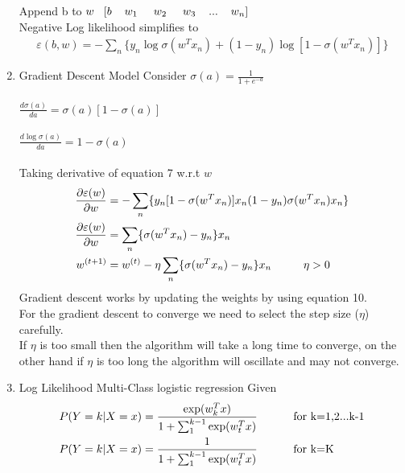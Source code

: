 \documentclass[12pt]{article}
\begin{document}
\begin{enumerate}[label=\alph*.]
    Append b to $w \hspace{3mm} [b \hspace{4mm} w_1 \hspace{5mm} w_2 \hspace{5mm} w_3 \hspace{4mm} ... \hspace{4mm} w_n]$\\
Negative Log likelihood simplifies to\\
\begin{align}
\varepsilon(b,w) = - \sum_n \{ y_n\log \sigma(w^T x_n) + (1-y_n) \log[1 - \sigma(w^T x_n)] \}
\end{align}
\newpage
\item Gradient Descent Model
Consider $\sigma(a) = \frac{1}{1+e^{-a}}$\\ \\
$\frac{d\sigma(a)}{da} = \sigma(a)[1 - \sigma(a)]$\\\\
$\frac{d\log \sigma(a)}{da} = 1 - \sigma(a)$\\\\
Taking derivative of equation 7 w.r.t $w$\\
\begin{align}
\frac{\partial \varepsilon(w) }{\partial w} &= - \sum_n \{ y_n[1-\sigma(w^T x_n)]x_n (1-y_n) \sigma (w^T x_n)x_n\}\\
\frac{\partial \varepsilon(w) }{\partial w} &= \sum_n \{ \sigma(w^Tx_n) - y_n \}x_n\\
w^{(t+1)} &= w^{(t)} - \eta \sum_n \{ \sigma(w^T x_n) -y_n \} x_n \hspace{10mm} \eta > 0
\end{align}
Gradient descent works by updating the weights by using equation 10.\\
For the gradient descent to converge we need to select the step size ($\eta$) carefully.\\
If $\eta$ is too small then the algorithm will take a long time to converge, on the other hand if $\eta$ is too long the algorithm will oscillate and may not converge.
\item Log Likelihood Multi-Class logistic regression
Given
\begin{align}
P(Y=k|X=x) &= \frac{\exp (w_k^T x)}{1+\sum_1^{k-1}\exp (w_t^T x)} \hspace{10mm} \textrm{ for k=1,2...k-1}\\
P(Y=k|X=x) &= \frac{1}{1+\sum_1^{k-1}\exp (w_t^T x)} \hspace{10mm} \textrm{ for k=K}

\end{align}
\end{enumerate}
\end{document}
